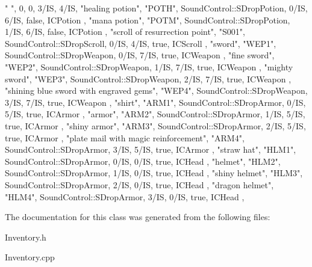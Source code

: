\begin{DoxyCode}
 {
        { " ", 0, 0, 3/IS,  4/IS}, 
        { "healing potion",                        "POTH", 
      SoundControl::SDropPotion, 0/IS, 6/IS, false, ICPotion },
        { "mana potion",                           "POTM", 
      SoundControl::SDropPotion, 1/IS, 6/IS, false, ICPotion },
        { "scroll of resurrection point",          "S001", 
      SoundControl::SDropScroll, 0/IS, 4/IS, true, ICScroll },
        { "sword",                                 "WEP1", 
      SoundControl::SDropWeapon, 0/IS, 7/IS, true, ICWeapon },
        { "fine sword",                            "WEP2", 
      SoundControl::SDropWeapon, 1/IS, 7/IS, true, ICWeapon },
        { "mighty sword",                          "WEP3", 
      SoundControl::SDropWeapon, 2/IS, 7/IS, true, ICWeapon },
        { "shining blue sword with engraved gems", "WEP4", 
      SoundControl::SDropWeapon, 3/IS, 7/IS, true, ICWeapon },
        { "shirt",                                 "ARM1", 
      SoundControl::SDropArmor,  0/IS, 5/IS, true, ICArmor },
        { "armor",                                 "ARM2", 
      SoundControl::SDropArmor,  1/IS, 5/IS, true, ICArmor },
        { "shiny armor",                           "ARM3", 
      SoundControl::SDropArmor,  2/IS, 5/IS, true, ICArmor },
        { "plate mail with magic reinforcement",   "ARM4", 
      SoundControl::SDropArmor,  3/IS, 5/IS, true, ICArmor },
        { "straw hat",                             "HLM1", 
      SoundControl::SDropArmor,  0/IS, 0/IS, true, ICHead },
        { "helmet",                                "HLM2", 
      SoundControl::SDropArmor,  1/IS, 0/IS, true, ICHead },
        { "shiny helmet",                          "HLM3", 
      SoundControl::SDropArmor,  2/IS, 0/IS, true, ICHead },
        { "dragon helmet",                         "HLM4", 
      SoundControl::SDropArmor,  3/IS, 0/IS, true, ICHead },
}
\end{DoxyCode}


\-The documentation for this class was generated from the following files\-:\begin{DoxyCompactItemize}
\item 
\-Inventory.\-h\item 
\-Inventory.\-cpp\end{DoxyCompactItemize}
